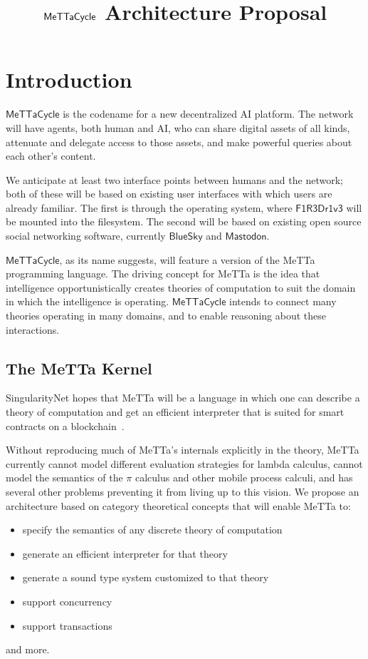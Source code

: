 \documentclass{article}
\title{$\MC$ Architecture Proposal}
\author{}
\date{}
\newcommand{\MC}{\mathsf{MeTTaCycle}}
\newcommand{\FD}{\mathsf{F1R3Dr1v3}}
\begin{document}
\maketitle

\tableofcontents

\section{Introduction}

$\MC$ is the codename for a new decentralized AI platform.  The network will have agents, both human and AI, who can share digital assets of all kinds, attenuate and delegate access to those assets, and make powerful queries about each other's content.  

We anticipate at least two interface points between humans and the network; both of these will be based on existing user interfaces with which users are already familiar.  The first is through the operating system, where $\FD$ will be mounted into the filesystem.  The second will be based on existing open source social networking software, currently $\mathsf{BlueSky}$ and $\mathsf{Mastodon}$.

$\MC$, as its name suggests, will feature a version of the MeTTa programming language.  The driving concept for MeTTa is the idea that intelligence opportunistically creates theories of computation to suit the domain in which the intelligence is operating.  $\MC$ intends to connect many theories operating in many domains, and to enable reasoning about these interactions.

\subsection{The MeTTa Kernel}

SingularityNet hopes that MeTTa will be a language in which one can describe a theory of computation and get an efficient interpreter that is suited for smart contracts on a blockchain~\cite{GoertzelMeredith2024}.

Without reproducing much of MeTTa's internals explicitly in the theory, MeTTa currently cannot model different evaluation strategies for lambda calculus, cannot model the semantics of the $\pi$ calculus and other mobile process calculi, and has several other problems preventing it from living up to this vision.  We propose an architecture based on category theoretical concepts that will enable MeTTa to:
\begin{itemize}
    \item specify the semantics of any discrete theory of computation
    \item generate an efficient interpreter for that theory
    \item generate a sound type system customized to that theory
    \item support concurrency
    \item support transactions
\end{itemize}
and more.
\end{document}
